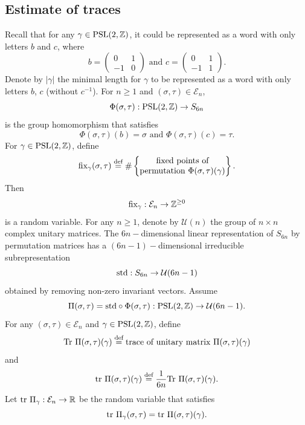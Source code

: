 \documentclass{amsart}
\theoremstyle{plain}
\theoremstyle{definition}
\theoremstyle{remark}
\begin{document}
    \subsection{Estimate of traces}
    Recall that for any $\gamma\in\textnormal{PSL}(2,\mathbb{Z})$, it could be represented as a word with only letters $b$ and $c$, where 
    $$b=\begin{pmatrix}
        0 & 1\\ -1 &0
    \end{pmatrix}\text{ and }c=\begin{pmatrix}
        0 & 1 \\ -1 &1
    \end{pmatrix}.$$
    Denote by $|\gamma|$ the minimal length for $\gamma$ to be represented as a word with only letters $b$, $c$ (without $c^{-1}$).
    For $n\geq 1$ and  $(\sigma,\tau)\in\mathcal{E}_n$, $$\Phi(\sigma,\tau):\textnormal{PSL}(2,\mathbb{Z})\to S_{6n}$$ is the group homomorphism that satisfies
    $$\Phi(\sigma,\tau)(b)=\sigma\text{ and }\Phi(\sigma,\tau)(c)=\tau.$$
    For $\gamma\in\textnormal{PSL}(2,\mathbb{Z})$, define
    $$\textnormal{fix}_\gamma(\sigma,\tau)\overset{\textnormal{def}}{=}\#\left\{\begin{matrix}
        \text{ fixed points of }\\
        \text{permutation }\Phi(\sigma,\tau)(\gamma)
    \end{matrix}\right\}.$$
    Then $$\textnormal{fix}_\gamma:\mathcal{E}_n\to\mathbb{Z}^{\geq 0}$$ is a random variable. For any $n\geq 1$, denote by $\mathcal{U}(n)$ the group of $n\times n$ complex unitary matrices. The $6n-$dimensional linear representation of $S_{6n}$ by permutation matrices has a $(6n-1)-$dimensional irreducible subrepresentation 
    $$\textnormal{std}:S_{6n}\to\mathcal{U}(6n-1)$$
    obtained by removing non-zero invariant vectors. Assume
    $$\Pi(\sigma,\tau)=\textnormal{std}\circ\Phi(\sigma,\tau):\textnormal{PSL}(2,\mathbb{Z})\to\mathcal{U}(6n-1).$$
    For any $(\sigma,\tau)\in\mathcal{E}_n$ and $\gamma\in\textnormal{PSL}(2,\mathbb{Z})$, define $$\textnormal{Tr }\Pi(\sigma,\tau)(\gamma)\overset{\textnormal{def}}{=}\text{trace of unitary matrix }\Pi(\sigma,\tau)(\gamma)$$ and
    $$\textnormal{tr }\Pi(\sigma,\tau)(\gamma)\overset{\textnormal{def}}{=}\frac{1}{6n}\textnormal{Tr }\Pi(\sigma,\tau)(\gamma).$$
     Let $\textnormal{tr }\Pi_\gamma:\mathcal{E}_n\to\mathbb{R}$ be the random variable that satisfies 
    $$\textnormal{tr }\Pi_\gamma(\sigma,\tau)=\textnormal{tr }\Pi(\sigma,\tau)(\gamma).$$
   
\end{document}
